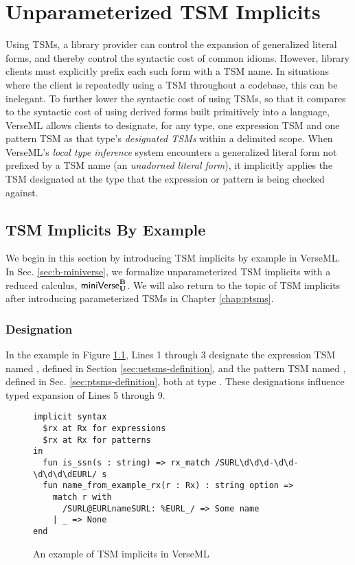 \chapter{Unparameterized TSM Implicits}\label{chap:tsls}
Using TSMs, a library provider can control the expansion of generalized literal forms, and thereby control the syntactic cost of common idioms. However, library clients must explicitly prefix each such form with a TSM name. In situations where the client is repeatedly using a TSM throughout a codebase, this can be inelegant. To further lower the syntactic cost of using TSMs, so that it compares to the syntactic cost of using derived forms built primitively into a language, VerseML allows clients to designate, for any type, one expression TSM and one pattern TSM as that type's \emph{designated TSMs} within a delimited scope. When VerseML's \emph{local type inference} system encounters a generalized literal form not prefixed by a TSM name (an \emph{unadorned literal form}), it implicitly applies the TSM designated at the type that the expression or pattern is being checked against.

\section{TSM Implicits By Example}\label{sec:tsm-implicits-by-example}
We begin in this section by introducing TSM implicits by example in VerseML. In Sec. \ref{sec:b-miniverse}, we formalize unparameterized TSM implicits with a reduced calculus, $\mathsf{miniVerse}_\textbf{U}^\textbf{B}$. We will also return to the topic of TSM implicits after introducing parameterized TSMs in Chapter \ref{chap:ptsms}.

\subsection{Designation}
In the example in Figure \ref{fig:implicits-example}, Lines 1 through 3 designate the expression TSM named , defined in Section \ref{sec:uetsms-definition}, and the pattern TSM named , defined in Sec. \ref{sec:ptsms-definition}, both at type . These designations influence typed expansion of Lines 5 through 9.  %
\begin{figure}
\begin{lstlisting}
implicit syntax 
  $rx at Rx for expressions
  $rx at Rx for patterns
in
  fun is_ssn(s : string) => rx_match /SURL\d\d\d-\d\d-\d\d\d\dEURL/ s
  fun name_from_example_rx(r : Rx) : string option => 
    match r with 
      /SURL@EURLnameSURL: %EURL_/ => Some name
    | _ => None
end
\end{lstlisting}
\caption{An example of TSM implicits in VerseML}
\label{fig:implicits-example}
\end{figure}


